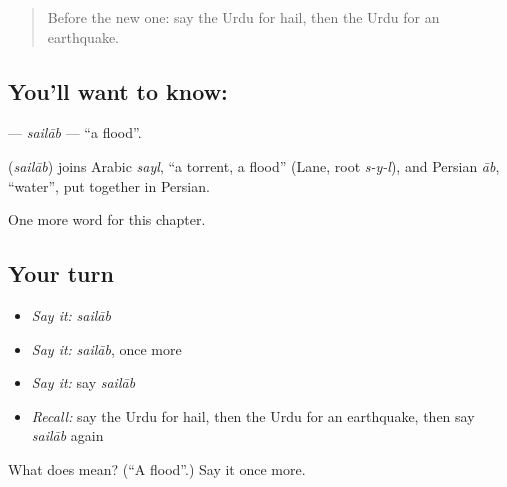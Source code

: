 \label{lesson:UR-C233-sailab}



\begin{quote}
Before the new one: say the Urdu for hail, then the Urdu for an earthquake.
\end{quote}

\subsection*{You'll want to know: }
\textbf{} — \emph{sailāb} — \textquotedblleft{}a flood\textquotedblright{}.

\begin{cousinweb}
\textbf{} (\emph{sailāb}) joins Arabic \emph{sayl}, \textquotedblleft{}a torrent, a flood\textquotedblright{} (Lane, root \emph{s-y-l}), and Persian \emph{āb}, \textquotedblleft{}water\textquotedblright{}, put together in Persian.
\end{cousinweb}

\begin{grammarlens}[title={What you've built}]
One more word for this chapter.
\end{grammarlens}

\subsection*{Your turn}
\begin{itemize}
\raggedright
  \item \emph{Say it:} \emph{sailāb}
  \item \emph{Say it:} \emph{sailāb}, once more
  \item \emph{Say it:} say \emph{sailāb}
  \item \emph{Recall:} say the Urdu for hail, then the Urdu for an earthquake, then say \emph{sailāb} again
\end{itemize}

\begin{tcolorbox}[breakable,colback=teal!4,colframe=teal!35!black,title={Before you move on}]
What does  mean? (\textquotedblleft{}A flood\textquotedblright{}.) Say it once more.
\end{tcolorbox}
